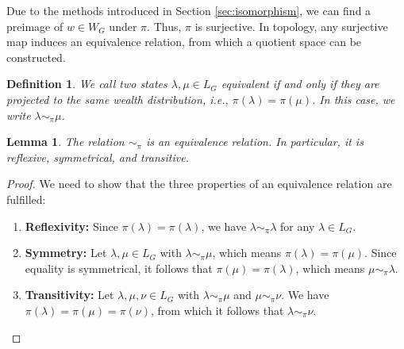 \documentclass[10pt,twocolumn]{article}
\newtheorem{definition}{Definition}[section]
\newtheorem{lemma}[theorem]{Lemma}
\begin{document}

Due to the methods introduced in Section \ref{sec:isomorphism}, we can find a preimage of \( w \in W_G \) under \( \pi \).  
Thus, \( \pi \) is surjective.  
In topology, any surjective map induces an equivalence relation, from which a quotient space can be constructed.  

\begin{definition}
We call two states \( \lambda, \mu \in L_G \) equivalent if and only if they are projected to the same wealth distribution, i.e., \( \pi(\lambda) = \pi(\mu) \).  
In this case, we write \( \lambda \sim_{\pi} \mu \).
\end{definition}

\begin{lemma}
The relation \( \sim_{\pi} \) is an equivalence relation. In particular, it is reflexive, symmetrical, and transitive.
\end{lemma}

\begin{proof}
We need to show that the three properties of an equivalence relation are fulfilled:
\begin{enumerate}
    \item \textbf{Reflexivity:} Since \( \pi(\lambda) = \pi(\lambda) \), we have \( \lambda \sim_{\pi} \lambda \) for any \( \lambda \in L_G \).
    \item \textbf{Symmetry:} Let \( \lambda, \mu \in L_G \) with \( \lambda \sim_{\pi} \mu \), which means \( \pi(\lambda) = \pi(\mu) \). Since equality is symmetrical, it follows that \( \pi(\mu) = \pi(\lambda) \), which means \( \mu \sim_{\pi} \lambda \).
    \item \textbf{Transitivity:} Let \( \lambda, \mu, \nu \in L_G \) with \( \lambda \sim_{\pi} \mu \) and \( \mu \sim_{\pi} \nu \). We have \( \pi(\lambda) = \pi(\mu) = \pi(\nu) \), from which it follows that \( \lambda \sim_{\pi} \nu \).
\end{enumerate}
\end{proof}


\end{document}
